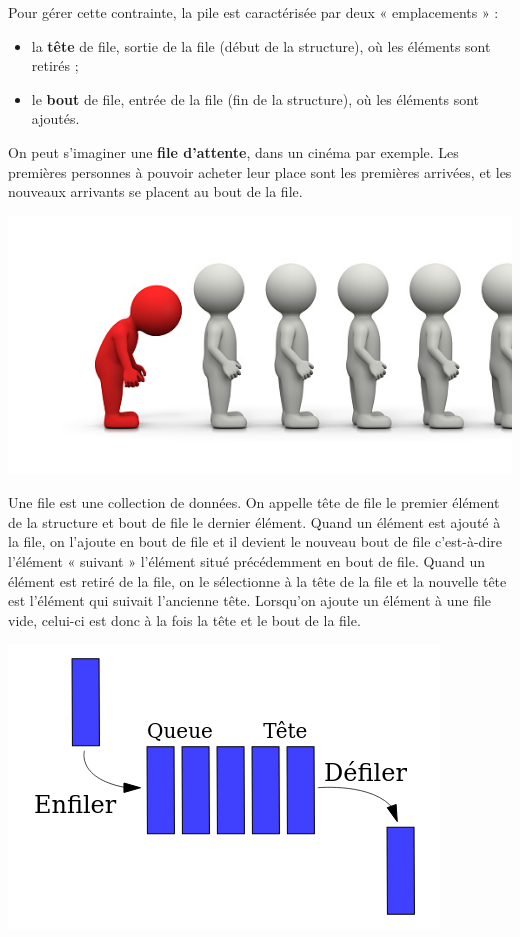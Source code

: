 \documentclass[
  a4paper,
  DIV=11,
  numbers=noendperiod]{scrartcl}
\providecommand{\tightlist}{%
  \setlength{\itemsep}{0pt}\setlength{\parskip}{0pt}}\usepackage{longtable,booktabs,array}
\begin{document}
Pour gérer cette contrainte, la pile est caractérisée par deux «
emplacements » :

\begin{itemize}
\tightlist
\item
  la \textbf{tête} de file, sortie de la file (début de la structure),
  où les éléments sont retirés ;
\item
  le \textbf{bout} de file, entrée de la file (fin de la structure), où
  les éléments sont ajoutés.
\end{itemize}

On peut s'imaginer une \textbf{file d'attente}, dans un cinéma par
exemple. Les premières personnes à pouvoir acheter leur place sont les
premières arrivées, et les nouveaux arrivants se placent au bout de la
file.

\includegraphics{file.jpg}

Une file est une collection de données. On appelle tête de file le
premier élément de la structure et bout de file le dernier élément.
Quand un élément est ajouté à la file, on l'ajoute en bout de file et il
devient le nouveau bout de file c'est-à-dire l'élément « suivant »
l'élément situé précédemment en bout de file. Quand un élément est
retiré de la file, on le sélectionne à la tête de la file et la nouvelle
tête est l'élément qui suivait l'ancienne tête. Lorsqu'on ajoute un
élément à une file vide, celui-ci est donc à la fois la tête et le bout
de la file.

\includegraphics{FIFO_queue.png}
\end{document}
